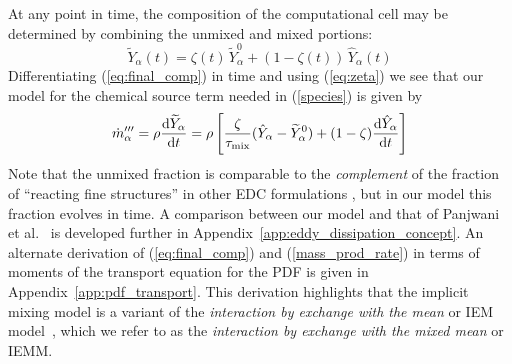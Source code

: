At any point in time, the composition of the computational cell may be determined by combining the unmixed and mixed portions:
\begin{equation}
\label{eq:final_comp}
\widetilde{Y}_{\alpha}(t)= \zeta(t) \, \widetilde{Y}_{\alpha}^0 + (1-\zeta(t)) \, \hat{Y}_{\alpha}(t)
\end{equation}
Differentiating (\ref{eq:final_comp}) in time and using (\ref{eq:zeta}) we see that our model for the chemical source term needed in (\ref{species}) is given by
\begin{equation}
\label{mass_prod_rate}
\dot{m}^{\prime\prime\prime}_{\alpha} = \rho \frac{\mbox{d}\widetilde{Y}_{\alpha}}{\mbox{d}t}
= \rho \left[ \frac{\zeta}{\tau_{\rm{mix}}} (\hat{Y}_\alpha - \widetilde{Y}_{\alpha}^0)  + (1-\zeta) \frac{\mbox{d}\hat{Y}_\alpha}{\mbox{d}t} \right]
\end{equation}
Note that the unmixed fraction is comparable to the \emph{complement} of the fraction of ``reacting fine structures'' in other EDC formulations \cite{Chen:1,Panjwani:2010}, but in our model this fraction evolves in time.  A comparison between our model and that of Panjwani et al.~\cite{Panjwani:2010} is developed further in Appendix~\ref{app:eddy_dissipation_concept}. An alternate derivation of (\ref{eq:final_comp}) and (\ref{mass_prod_rate}) in terms of moments of the transport equation for the PDF is given in Appendix~\ref{app:pdf_transport}.  This derivation highlights that the implicit mixing model is a variant of the {\em interaction by exchange with the mean} or IEM model~\cite{Dopazo:1974}, which we refer to as the {\em interaction by exchange with the mixed mean} or IEMM.

